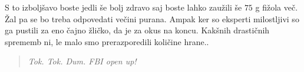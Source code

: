 \documentclass[a4paper]{article}
\begin{document}
S to izboljšavo boste jedli še bolj zdravo saj boste lahko zaužili še $75$ g fižola več. Žal pa 
se bo treba odpovedati večini purana. Ampak ker so eksperti milostljivi so ga pustili za eno čajno 
žličko, da je za okus na koncu. Kakšnih drastičnih sprememb ni, le malo smo prerazporedili količine
hrane..

\begin{quote}
    \centering
    \textit{Tok. Tok. Dum. FBI open up!}
\end{quote}

\begin{figure}[H]
    \centering
\end{figure}
\end{document}
